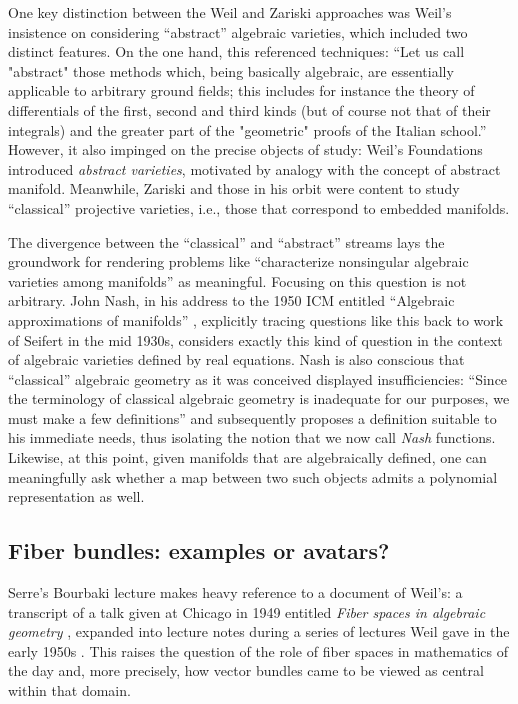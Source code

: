 \documentclass[11pt,leqno]{article}
\renewcommand{\1}{{\rm 1\hspace*{-0.4ex}%
\rule{0.1ex}{1.52ex}\hspace*{0.2ex}}}
\newcommand{\<}[1]{{\langle}#1 {\rangle}}
\newcounter{intro}
\theoremstyle{plain}
\theoremstyle{definition}
\theoremstyle{remark}
\numberwithin{equation}{subsection}
\begin{document}
One key distinction between the Weil and Zariski approaches was Weil's insistence on considering ``abstract'' algebraic varieties, which included two distinct features.  On the one hand, this referenced techniques: ``Let us call "abstract" those methods
which, being basically algebraic, are essentially applicable to arbitrary ground fields; this includes for instance the theory of differentials of the first, second and third kinds (but of course not that of their integrals) and the greater part of the "geometric" proofs of the Italian school.''  However, it also impinged on the precise objects of study: Weil's Foundations introduced {\em abstract varieties}, motivated by analogy with the concept of abstract manifold.  Meanwhile, Zariski and those in his orbit were content to study ``classical'' projective varieties, i.e., those that correspond to embedded manifolds.  

The divergence between the ``classical'' and ``abstract'' streams lays the groundwork for rendering problems like ``characterize nonsingular algebraic varieties among manifolds'' as meaningful.  Focusing on this question is not arbitrary.  John Nash, in his address to the 1950 ICM entitled ``Algebraic approximations of manifolds'' \cite{Nash1952Algebraic}, explicitly tracing questions like this back to work of Seifert in the mid 1930s, considers exactly this kind of question in the context of algebraic varieties defined by real equations.  Nash is also conscious that ``classical'' algebraic geometry as it was conceived displayed insufficiencies: ``Since the terminology of classical algebraic geometry is inadequate for our purposes, we must make a few definitions'' and subsequently proposes a definition suitable to his immediate needs, thus isolating the notion that we now call {\em Nash} functions.  Likewise, at this point, given manifolds that are algebraically defined, one can meaningfully ask whether a map between two such objects admits a polynomial representation as well.

\subsection{Fiber bundles: examples or avatars?}
\label{ss:fiberbundles}
Serre's Bourbaki lecture makes heavy reference to a document of Weil's: a transcript of a talk given at Chicago in 1949 entitled {\em Fiber spaces in algebraic geometry} \cite{WeilI}, expanded into lecture notes during a series of lectures Weil gave in the early 1950s \cite{WeilFBCourse}.  This raises the question of the role of fiber spaces in mathematics of the day and, more precisely, how vector bundles came to be viewed as central within that domain.
\end{document}
